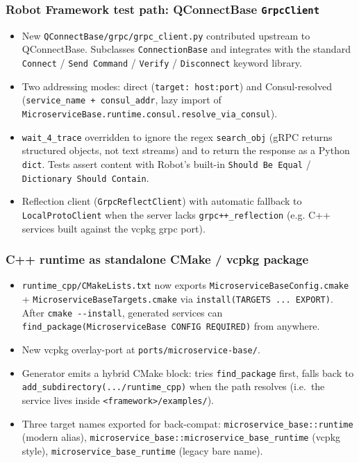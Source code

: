 \subsubsection{Robot Framework test path: QConnectBase \texttt{GrpcClient}}

\begin{itemize}
   \item New \texttt{QConnectBase/grpc/grpc\_client.py} contributed upstream
         to QConnectBase.  Subclasses \texttt{ConnectionBase} and integrates
         with the standard \texttt{Connect} / \texttt{Send Command} /
         \texttt{Verify} / \texttt{Disconnect} keyword library.
   \item Two addressing modes: direct (\texttt{target: host:port}) and
         Consul-resolved (\texttt{service\_name + consul\_addr}, lazy import
         of \texttt{MicroserviceBase.runtime.consul.resolve\_via\_consul}).
   \item \texttt{wait\_4\_trace} overridden to ignore the regex
         \texttt{search\_obj} (gRPC returns structured objects, not text
         streams) and to return the response as a Python \texttt{dict}.
         Tests assert content with Robot's built-in
         \texttt{Should Be Equal} / \texttt{Dictionary Should Contain}.
   \item Reflection client (\texttt{GrpcReflectClient}) with automatic
         fallback to \texttt{LocalProtoClient} when the server lacks
         \texttt{grpc++\_reflection} (e.g. C++ services built against the
         vcpkg grpc port).
\end{itemize}

\subsubsection{C++ runtime as standalone CMake / vcpkg package}

\begin{itemize}
   \item \texttt{runtime\_cpp/CMakeLists.txt} now exports
         \texttt{MicroserviceBaseConfig.cmake} +
         \texttt{MicroserviceBaseTargets.cmake} via
         \texttt{install(TARGETS ... EXPORT)}.  After
         \texttt{cmake -{}-install}, generated services can
         \texttt{find\_package(MicroserviceBase CONFIG REQUIRED)} from anywhere.
   \item New vcpkg overlay-port at \texttt{ports/microservice-base/}.
   \item Generator emits a hybrid CMake block: tries
         \texttt{find\_package} first, falls back to
         \texttt{add\_subdirectory(.../runtime\_cpp)} when the path resolves
         (i.e.\ the service lives inside \texttt{<framework>/examples/}).
   \item Three target names exported for back-compat:
         \texttt{microservice\_base::runtime} (modern alias),
         \texttt{microservice\_base::microservice\_base\_runtime} (vcpkg style),
         \texttt{microservice\_base\_runtime} (legacy bare name).
\end{itemize}

